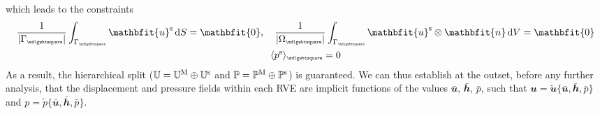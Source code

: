\documentclass[12pt,a4paper]{article}
\renewcommand{\ta}[1]{\mathbfit{#1}}
\renewcommand{\ts}[1]{\mathbfit{#1}}
\renewcommand{\Box}{\mdlgwhtsquare}
\DeclarePairedDelimiter{\homgen}{\langle}{\rangle_\rve}
\newcommand{\volume}{|\Omega_\rve|}
\newcommand{\rve}{
  {\mathchoice
   {\mbox{\scalebox{0.67}{$\Box$}}}
   {\mbox{\scalebox{0.67}{$\Box$}}}
   {\mbox{\scalebox{0.5}{$\Box$}}}
   {\mbox{\scalebox{0.375}{$\Box$}}}
  }
}
\begin{document}
which leads to the constraints
\begin{subequations}\label{eq13}
\begin{gather}
    \frac{1}{|\Gamma_\rve|} \int_{\Gamma_\rve} \ta{u}^\fluct \dif S = \ta 0, \quad
    \frac{1}{\volume} \int_{\Gamma_\rve} \ta{u}^\fluct \outerp \ta n \dif V = \ts 0
\label{eq13a} \\
    \homgen{p^\fluct} = 0
\label{eq13b}
\end{gather}
\end{subequations}
As a result, the hierarchical split ($\mathbb{U} = \mathbb{U}^{\mathrm{M}} \oplus \mathbb{U}^{\mathrm{s}}$ and $\mathbb{P} = \mathbb{P}^{\mathrm{M}} \oplus \mathbb{P}^{\mathrm{s}}$) is guaranteed.
We can thus establish at the outset, before any further analysis, that the displacement and pressure fields within each RVE are implicit functions of the values $\bar{\ta u}$, $\bar{\ts h}$, $\bar{p}$, such that $\ta u = \tilde{\ta u}\{\bar{\ta u}, \bar{\ts h}, \bar{p}\}$ and $p = \tilde{p}\{\bar{\ta u}, \bar{\ts h}, \bar{p}\}$.
\end{document}
